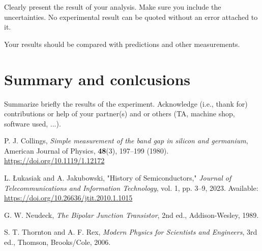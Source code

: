 \documentclass[12pt,letterpaper,twocolumn]{article}
\begin{document}
Clearly present the result of your analysis. Make sure
you include the uncertainties. No experimental result
can be quoted without an error attached to it.

Your results should be compared with predictions and other
measurements.



\section{Summary and conlcusions}

Summarize briefly the results of the experiment.
Acknowledge (i.e., thank for) contributions or help
of your partner(s) and or
others (TA, machine shop, software used, ...).


\begin{thebibliography}{9}

P. J. Collings, 
\textit{Simple measurement of the band gap in silicon and germanium}, 
American Journal of Physics, \textbf{48}(3), 197--199 (1980). 
\href{https://doi.org/10.1119/1.12172}{https://doi.org/10.1119/1.12172}

L. Łukasiak and A. Jakubowski, 
"History of Semiconductors," 
\textit{Journal of Telecommunications and Information Technology}, vol. 1, pp. 3–9, 2023. 
Available: \url{https://doi.org/10.26636/jtit.2010.1.1015}

G. W. Neudeck, 
\textit{The Bipolar Junction Transistor}, 2nd ed., 
Addison-Wesley, 1989.

S. T. Thornton and A. F. Rex, 
\textit{Modern Physics for Scientists and Engineers}, 3rd ed., 
Thomson, Brooks/Cole, 2006.

\end{thebibliography}

\end{document}
